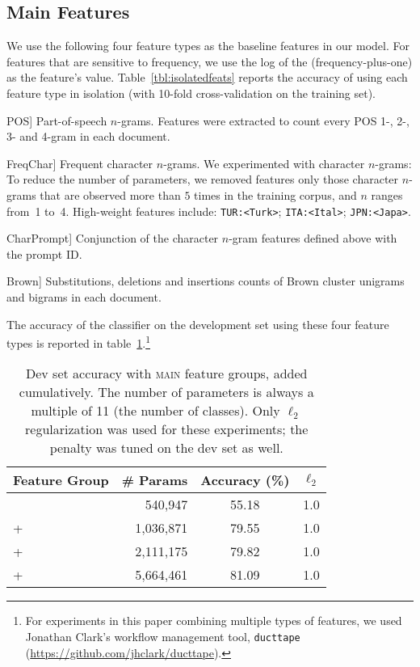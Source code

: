 \documentclass[11pt,letterpaper]{article}
\newcommand{\ignore}[1]{}
\newcommand{\tref}[1]{table~\ref{#1}}
\newcommand{\Tref}[1]{Table~\ref{#1}}
\newcommand{\feat}[1]{\textsmaller[.5]{\textsf{#1}}} %
\begin{document}
\subsection{Main Features}
\label{sec:mainfeats}
We use the following four feature types as the baseline features in our
model.  For features that are sensitive to frequency, we use the log of the (frequency-plus-one) as
the feature's value.  \Tref{tbl:isolatedfeats} reports the accuracy of using each feature type in
isolation (with 10-fold cross-validation on the training set).


\begin{compactdesc}
\item[\feat{POS}] Part-of-speech $n$-grams.  Features were extracted
  to count every POS 1-, 2-, 3- and 4-gram in each
  document. \ignore{CHI:IN PRP VBD, ARA:NN VBZ, KOR:DT JJ} 
\item[\feat{FreqChar}] Frequent character $n$-grams.  We experimented
  with character $n$-grams: To reduce the number of parameters, we removed features
  only those character $n$-grams that are observed more
  than $5$ times in the training corpus, and $n$ ranges from~1
    to~4. High-weight features include: {\tt TUR:<Turk>}; {\tt ITA:<Ital>}; {\tt JPN:<Japa>}.
\item[\feat{CharPrompt}] Conjunction of the character $n$-gram
  features defined above with the prompt ID.
\item[\feat{Brown}] Substitutions, deletions and insertions counts of Brown cluster 
unigrams and bigrams in each document.\ignore{in top-30 features Brown features occur up to 5 times in 10 out of 11 L1s (all except Arabic)} 
\end{compactdesc}
\noindent
The accuracy of the classifier on the development set using these four
feature types is reported in \tref{tbl:mainfeats}.\footnote{For experiments in this paper combining multiple types of features, 
we used Jonathan Clark's workflow management tool, \texttt{ducttape} (\url{https://github.com/jhclark/ducttape}).}

\begin{table}[hbt]
\small\centering
\begin{tabular}{lrcc}
\textbf{Feature Group} & \multicolumn{1}{c}{\textbf{\# Params}} & \textbf{Accuracy (\%)} & \textbf{$\ell_2$} \\
\hline
\feat{POS} & 540,947 & 55.18 & 1.0 \\
+ \feat{FreqChar} & 1,036,871 & 79.55 & 1.0 \\ 
\quad + \feat{CharPrompt} & 2,111,175 & 79.82 & 1.0 \\ 
\qquad + \feat{Brown} & 5,664,461 & 81.09 & 1.0 \\
\end{tabular}
\caption{Dev set accuracy with \textsc{main} feature groups, added cumulatively. 
  The number of parameters is always a multiple of 11 (the number of classes). 
  Only $\ell_2$ regularization was used for these experiments; 
  the penalty was tuned on the dev set as well.}
\label{tbl:mainfeats}
\end{table}
\end{document}
